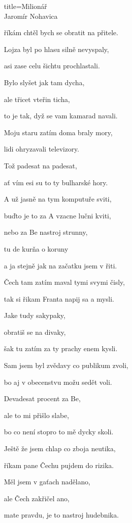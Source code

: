 \begin{song}{title=\centering Milionář \\\normalsize Jaromír Nohavica  \vspace*{-0.3cm}}
{\begin{minipage}[t]{0.48\textwidth}
říkám chtěl bych se obratit na přitele.

\sloka
Lojza byl po hlasu silně nevyspaly, 

asi zase celu šichtu prochlastali.

Bylo slyšet jak tam dycha, 

ale třicet vteřin ticha, 

to je tak, dyž se vam kamarad navali.

\sloka
Moju staru zatím doma braly mory,

lidi ohryzavali televizory.



\end{minipage}\begin{minipage}[t]{0.5\textwidth}\setlength{\parindent}{0.45cm}\vspace*{1.07cm}  %

Tož padesat na padesat, 

ať vím esi su to ty bulharské hory.

\sloka
A už jasně na tym komputuře sviti, 

buďto je to za A vzacne lučni kviti, 

nebo za Be nastroj strunny, 

tu de kurňa o koruny 

a ja stejně jak na začatku jsem v řiti.

\sloka
Čech tam zatím maval tymi svymi čisly,

tak si řikam Franta napij sa a mysli. 

Jake tudy sakypaky, 

obratiš se na divaky,

šak tu zatím za ty prachy enem kysli. 

\sloka
Sam jsem byl zvědavy co publikum zvoli, 

bo aj v obecenstvu možu sedět voli. 

Devadesat procent za Be, 

ale to mi přišlo slabe, 

bo co není stopro to mě dycky skoli. 

\sloka
Ještě že jsem chlap co zboja neutika, 

říkam pane Čechu pujdem do rizika. 

Měl jsem v gaťach nadělano, 

ale Čech zakřičel ano, 

mate pravdu, je to nastroj hudebnika.


\end{minipage}}
\end{song}
